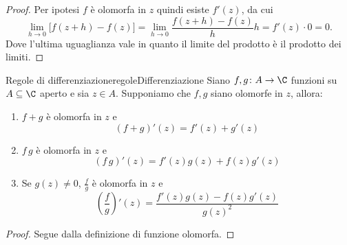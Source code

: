\begin{proof}
	Per ipotesi \(f\) è olomorfa in \(z\) quindi esiste \(f'(z)\), da cui
	\[
		\lim_{h\to 0} \big[f(z+h)-f(z)\big] = \lim_{h\to 0} \frac{f(z+h)-f(z)}{h}h = f'(z) \cdot 0 = 0.
	\]
	Dove l'ultima uguaglianza vale in quanto il limite del prodotto è il prodotto dei limiti.
\end{proof}

\begin{prop}{Regole di differenziazione}{regoleDifferenziazione}
	Siano \(f,g\colon A \to \C\) funzioni su \(A\subseteq \C\) aperto e sia \(z\in A\).
	Supponiamo che \(f,g\) siano olomorfe in \(z\), allora:
	\begin{enumerate}
		\item \(f+g\) è olomorfa in \(z\) e
		      \[
			      (f+g)'(z)=f'(z)+g'(z)
		      \]
		\item \(f\,g\) è olomorfa in \(z\) e
		      \[
			      (f\,g)'(z) = f'(z)g(z)+f(z)g'(z)
		      \]
		\item Se \(g(z)\neq 0\), \(\frac{f}{g}\) è olomorfa in \(z\) e
		      \[
			      \left( \frac{f}{g} \right)'(z) = \frac{f'(z)g(z)-f(z)g'(z)}{g(z)^2}
		      \]
	\end{enumerate}
\end{prop}

\begin{proof}
	Segue dalla definizione di funzione olomorfa.
\end{proof}

